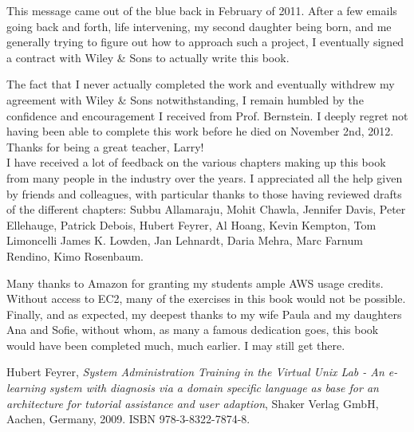 This message came out of the blue back in February of
2011.  After a few emails going back and forth, life
intervening, my second daughter being born, and me
generally trying to figure out how to approach such a
project, I eventually signed a contract with Wiley \&
Sons to actually write this book.

The fact that I never actually completed the work and
eventually withdrew my agreement with Wiley \& Sons
notwithstanding, I remain humbled by the confidence
and encouragement I received from Prof. Bernstein.  I
deeply regret not having been able to complete this
work before he died on November 2nd, 2012.  Thanks for
being a great teacher, Larry!
\\

I have received a lot of feedback on the various
chapters making up this book from many people in the
industry over the years.  I appreciated all the help
given by friends and colleagues, with particular
thanks to those having reviewed drafts of the
different chapters:
Subbu Allamaraju,
Mohit Chawla,
Jennifer Davis,
Peter Ellehauge,
Patrick Debois,
Hubert Feyrer,
Al Hoang,
Kevin Kempton,
Tom Limoncelli
James K. Lowden,
Jan Lehnardt,
Daria Mehra,
Marc Farnum Rendino,
Kimo Rosenbaum.

Many thanks to Amazon for granting my students ample
AWS usage credits.  Without access to EC2, many of the
exercises in this book would not be possible.
\\

Finally, and as expected, my deepest thanks to my wife
Paula and my daughters Ana and Sofie, without whom, as
many a famous dedication goes, this book would have
been completed much, much earlier.  I may still get
there.


\pagebreak

\begin{thebibliography}{99}

Hubert Feyrer, {\em System Administration Training in
the Virtual Unix Lab - An e-learning system with diagnosis via a domain
specific language as base for an architecture for tutorial assistance and
user adaption}, Shaker Verlag GmbH, Aachen, Germany, 2009. ISBN
978-3-8322-7874-8.


\end{thebibliography}
